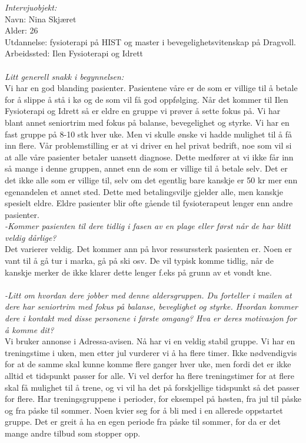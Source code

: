 \emph{Intervjuobjekt:}\\
Navn: Nina Skjæret\\
Alder: 26 \\
Utdannelse: fysioterapi på HIST og master i bevegelighetsvitenskap på Dragvoll. \\
Arbeidssted: Ilen Fysioterapi og Idrett\\ \\
\emph{Litt generell snakk i begynnelsen:}\\
Vi har en god blanding pasienter. Pasientene våre er de som er villige til å betale for å slippe å stå i kø og de som vil få god oppfølging. Når det kommer til Ilen Fysioterapi og Idrett så er eldre en gruppe vi prøver å sette fokus på. Vi har blant annet seniortrim med fokus på balanse, bevegelighet og styrke. Vi har en fast gruppe på 8-10 stk hver uke. Men vi skulle ønske vi hadde mulighet til å få inn flere. Vår problemstilling er at vi driver en hel privat bedrift, noe som vil si at alle våre pasienter betaler uansett diagnose. Dette medfører at vi ikke får inn så mange i denne gruppen, annet enn de som er villige til å betale selv. Det er det ikke alle som er villige til, selv om det egentlig bare kanskje er 50 kr mer enn egenandelen et annet sted. Dette med betalingsvilje gjelder alle, men kanskje spesielt eldre. Eldre pasienter blir ofte gående til fysioterapeut lenger enn andre pasienter. \\
\emph{-Kommer pasienten til dere tidlig i fasen av en plage eller først når de har blitt veldig dårlige?}\\
Det varierer veldig. Det kommer ann på hvor ressurssterk pasienten er. Noen er vant til å gå tur i marka, gå på ski osv. De vil typisk komme tidlig, når de kanskje merker de ikke klarer dette lenger f.eks på grunn av et vondt kne. \\ \\
\emph{-Litt om hvordan dere jobber med denne aldersgruppen. Du forteller i mailen at dere har seniortrim med fokus på balanse, beveglighet og styrke. Hvordan kommer dere i kontakt med disse personene i første omgang? Hva er deres motivasjon for å komme dit?}\\
Vi bruker annonse i Adressa-avisen. Nå har vi en veldig stabil gruppe. Vi har en treningstime i uken, men etter jul vurderer vi å ha flere timer. Ikke nødvendigvis for at de samme skal kunne komme flere ganger hver uke, men fordi det er ikke alltid et tidspunkt passer for alle. Vi vel derfor ha flere treningstimer for at flere skal få mulighet til å trene, og vi vil ha det på forskjellige tidspunkt så det passer for flere. Har treningsgruppene i perioder, for eksempel på høsten, fra jul til påske og fra påske til sommer. Noen kvier seg for å bli med i en allerede oppstartet gruppe. Det er greit å ha en egen periode fra påske til sommer, for da er det mange andre tilbud som stopper opp. \\ \\
